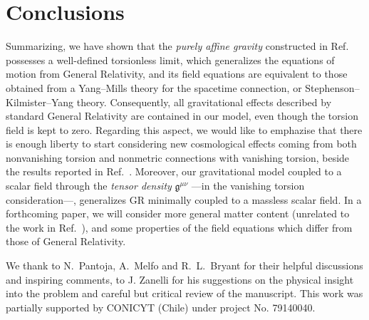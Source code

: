 \documentclass[aps,prd,12pt,twocolumn,superscriptaddress,showpacs,showkeys,reprint,longbibliography]{revtex4-1}
\renewcommand{\(}{\left(}
\renewcommand{\)}{\right)}
\renewcommand{\[}{\left[}
\renewcommand{\]}{\right]}
\begin{document}
\section{\label{conclusions}Conclusions}

Summarizing, we have shown that the  \emph{purely affine gravity} constructed in Ref.~\cite{Skirzewski:2014eta} possesses a well-defined torsionless limit, which generalizes the equations of motion  from General Relativity, and its field equations are equivalent to those obtained from a Yang--Mills theory for the spacetime connection, or Stephenson--Kilmister--Yang theory. Consequently, all gravitational effects described by standard General Relativity are contained in our model, even though the torsion field is kept to zero. Regarding this aspect, we would like to emphazise that there is enough liberty to start considering new cosmological effects coming from both nonvanishing torsion and nonmetric connections with vanishing torsion, beside the results reported in Ref.~\cite{Chen:2013kia,Chen:2013ota}.
Moreover, our gravitational model coupled to a scalar field through the \emph{tensor density} $\mathfrak{g}^{\mu\nu}$ ---in the vanishing torsion consideration---, generalizes GR minimally coupled to a massless scalar field. In a forthcoming paper, we will consider more general matter content (unrelated to the work in Ref.~\cite{Cook:2008mx}), and some properties of the field equations which differ from those of General Relativity.

\begin{acknowledgments}
  We thank to N.~Pantoja, A.~Melfo and R.~L.~Bryant for their helpful discussions and inspiring comments, to J. Zanelli for his suggestions on the physical insight into the problem and careful but critical review of the manuscript.
  This work was partially supported by CONICYT (Chile) under project No. 79140040.
\end{acknowledgments}

\appendix





\end{document}

